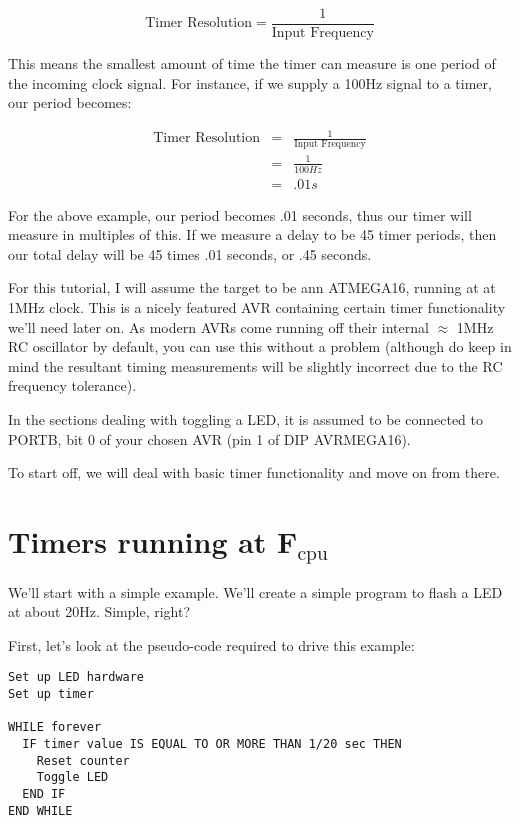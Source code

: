 \documentclass[a4paper,oneside]{book}
\newcommand{\subscript}[1]{\ensuremath{_{\textrm{#1}}}}
\begin{document}
\begin{displaymath}
	\text{Timer Resolution} = \frac{1}{\text{Input Frequency}}
\end{displaymath}

This means the smallest amount of time the timer can measure is one period of the incoming clock signal. For instance, if we supply a 100Hz signal to a timer, our period becomes:

\begin{displaymath}
\begin{array}{rcl}
	\text{Timer Resolution} & = & \frac{1}{\text{Input Frequency}} \\
	                        & = & \frac{1}{100 Hz} \\
	                        & = & .01s
\end{array}
\end{displaymath}

For the above example, our period becomes .01 seconds, thus our timer will measure in multiples of this. If we measure a delay to be 45 timer periods, then our total delay will be 45 times .01 seconds, or .45 seconds.

For this tutorial, I will assume the target to be ann ATMEGA16, running at at 1MHz clock. This is a nicely featured AVR containing certain timer functionality we'll need later on. As modern AVRs come running off their internal \(\approx\) 1MHz RC oscillator by default, you can use this without a problem (although do keep in mind the resultant timing measurements will be slightly incorrect due to the RC frequency tolerance).

In the sections dealing with toggling a LED, it is assumed to be connected to PORTB, bit 0 of your chosen AVR (pin 1 of DIP AVRMEGA16).

To start off, we will deal with basic timer functionality and move on from there. 

\label{chp:TimersFcpu}
\chapter{Timers running at F\subscript{cpu}}

We'll start with a simple example. We'll create a simple program to flash a LED at about 20Hz. Simple, right?

First, let's look at the pseudo-code required to drive this example:

\begin{center}
\begin{lstlisting}[keywordstyle=\color{black},commentstyle=\color{black}]
Set up LED hardware
Set up timer

WHILE forever
  IF timer value IS EQUAL TO OR MORE THAN 1/20 sec THEN
    Reset counter
    Toggle LED
  END IF
END WHILE
\end{lstlisting}
\end{center}
\end{document}
